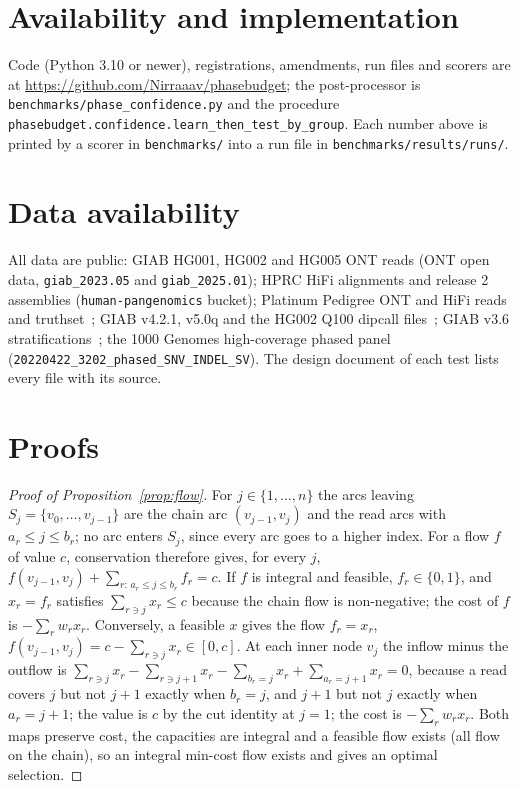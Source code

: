\documentclass[11pt]{article}
\theoremstyle{definition}
\theoremstyle{remark}
\begin{document}
\section*{Availability and implementation}
Code (Python 3.10 or newer), registrations, amendments, run files and
scorers are at \url{https://github.com/Nirraaav/phasebudget}; the
post-processor is \nolinkurl{benchmarks/phase_confidence.py} and the
procedure \nolinkurl{phasebudget.confidence.learn_then_test_by_group}. Each
number above is printed by a scorer in \nolinkurl{benchmarks/} into a run
file in \nolinkurl{benchmarks/results/runs/}.

\section*{Data availability}
All data are public: GIAB HG001, HG002 and HG005 ONT reads (ONT open data,
\texttt{giab\_2023.05} and \texttt{giab\_2025.01}); HPRC HiFi alignments and
release 2 assemblies (\texttt{human-pangenomics} bucket); Platinum Pedigree
ONT and HiFi reads and truthset~\cite{kronenberg2025}; GIAB v4.2.1, v5.0q and
the HG002 Q100 dipcall files~\cite{hansen2026}; GIAB v3.6
stratifications~\cite{dwarshuis2024}; the 1000 Genomes high-coverage phased
panel (\texttt{20220422\_3202\_phased\_SNV\_INDEL\_SV}). The design document of
each test lists every file with its source.

\appendix

\section{Proofs}\label{app:proofs}

\begin{proof}[Proof of Proposition~\ref{prop:flow}]
For $j\in\{1,\dots,n\}$ the arcs leaving $S_j=\{v_0,\dots,v_{j-1}\}$ are the
chain arc $(v_{j-1},v_j)$ and the read arcs with $a_r\le j\le b_r$; no arc
enters $S_j$, since every arc goes to a higher index. For a flow $f$ of value
$c$, conservation therefore gives, for every $j$,
$f(v_{j-1},v_j)+\sum_{r:\,a_r\le j\le b_r}f_r=c$. If $f$ is integral and
feasible, $f_r\in\{0,1\}$, and $x_r=f_r$ satisfies $\sum_{r\ni j}x_r\le c$
because the chain flow is non-negative; the cost of $f$ is $-\sum_rw_rx_r$.
Conversely, a feasible $x$ gives the flow $f_r=x_r$,
$f(v_{j-1},v_j)=c-\sum_{r\ni j}x_r\in[0,c]$. At each inner node $v_j$ the
inflow minus the outflow is $\sum_{r\ni j}x_r-\sum_{r\ni j+1}x_r-
\sum_{b_r=j}x_r+\sum_{a_r=j+1}x_r=0$, because a read covers $j$ but not $j+1$
exactly when $b_r=j$, and $j+1$ but not $j$ exactly when $a_r=j+1$; the value
is $c$ by the cut identity at $j=1$; the cost is $-\sum_rw_rx_r$. Both maps
preserve cost, the capacities are integral and a feasible flow exists (all
flow on the chain), so an integral min-cost flow exists and gives an optimal
selection.
\end{proof}
\end{document}
